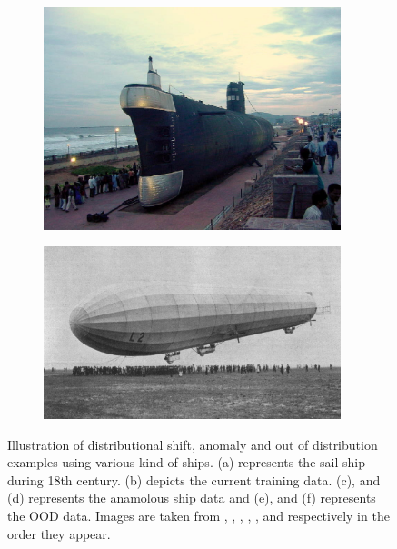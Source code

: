 \begin{figure}[h!]
\begin{subfigure}{0.333\textwidth}
        \includegraphics[height=0.15\textheight,width=0.95\textwidth]{images/intro_ood_anomaly/ood_submarine.jpg}
        \caption{}
        \label{fig:ood_submarine}
    \end{subfigure}
    \begin{subfigure}{0.333\textwidth}
        \centering
        \includegraphics[height=0.15\textheight,width=0.95\textwidth]{images/intro_ood_anomaly/ood_airship.jpg}
        \caption{}
        \label{fig:ood_airship}
    \end{subfigure}
    \caption{Illustration of distributional shift, anomaly and out of distribution examples using various kind of ships. (a) represents the sail ship during 18th century. (b) depicts the current training data.
    (c), and (d) represents the anamolous ship data and (e), and (f) represents the OOD data. Images are taken from \cite{old_ship}, \cite{train_cruiser}, \cite{container},
    \cite{titanic}, \cite{submarine}, and \cite{airship} respectively in the order they appear.}
\end{figure}

